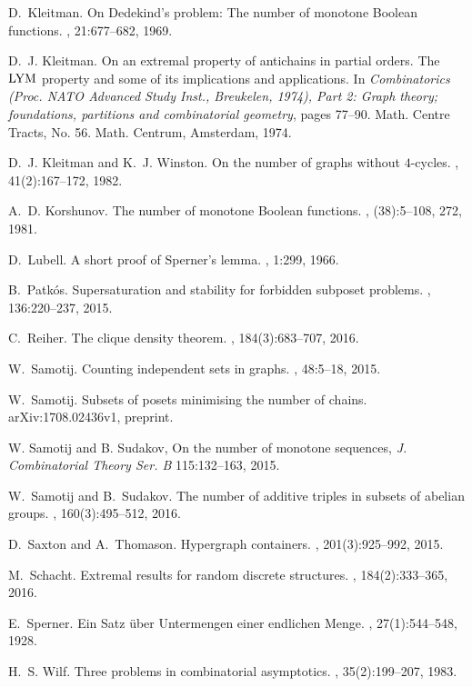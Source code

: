 \documentclass[11 pt]{article}
\theoremstyle{definition}
\theoremstyle{case}
\numberwithin{equation}{section}
\begin{document}
\begin{thebibliography}{10}
D.~Kleitman.
\newblock On {D}edekind's problem: {T}he number of monotone {B}oolean
  functions.
, 21:677--682, 1969.

D.~J. Kleitman.
\newblock On an extremal property of antichains in partial orders. {T}he {${\rm
  LYM}$} property and some of its implications and applications.
\newblock In {\em Combinatorics ({P}roc. {NATO} {A}dvanced {S}tudy {I}nst.,
  {B}reukelen, 1974), {P}art 2: {G}raph theory; foundations, partitions and
  combinatorial geometry}, pages 77--90. Math. Centre Tracts, No. 56. Math.
  Centrum, Amsterdam, 1974.

D.~J. Kleitman and K.~J. Winston.
\newblock On the number of graphs without {$4$}-cycles.
, 41(2):167--172, 1982.

A.~D. Korshunov.
\newblock The number of monotone {B}oolean functions.
, (38):5--108, 272, 1981.

D.~Lubell.
\newblock A short proof of {S}perner's lemma.
, 1:299, 1966.

B.~Patk{\'o}s.
\newblock Supersaturation and stability for forbidden subposet problems.
, 136:220--237, 2015.

C.~Reiher.
\newblock The clique density theorem.
, 184(3):683--707, 2016.

W.~Samotij.
\newblock Counting independent sets in graphs.
, 48:5--18, 2015.

W.~Samotij.
\newblock Subsets of posets minimising the number of chains.
\newblock arXiv:1708.02436v1, preprint.

W. Samotij and B. Sudakov, On the number of monotone sequences, 
{\em J. Combinatorial Theory Ser. B} 115:132--163, 2015. 

W.~Samotij and B.~Sudakov.
\newblock The number of additive triples in subsets of abelian groups.
, 160(3):495--512, 2016.

D.~Saxton and A.~Thomason.
\newblock Hypergraph containers.
, 201(3):925--992, 2015.

M.~Schacht.
\newblock Extremal results for random discrete structures.
, 184(2):333--365, 2016.

E.~Sperner.
\newblock Ein {S}atz \"uber {U}ntermengen einer endlichen {M}enge.
, 27(1):544--548, 1928.

H.~S. Wilf.
\newblock Three problems in combinatorial asymptotics.
, 35(2):199--207, 1983.



\end{thebibliography}
  
\end{document}

